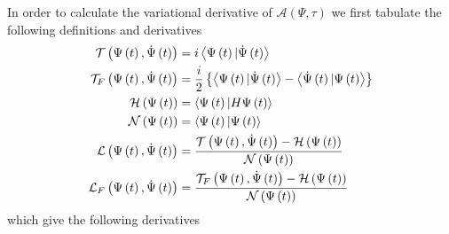 \documentclass[aps,preprint]{revtex4}
\begin{document}
In order to calculate the variational derivative of $\mathcal{A}\left(
\Psi,\tau\right) $ we first tabulate the following definitions and
derivatives 
\begin{align}
\mathcal{T}\left( \Psi\left( t\right) ,\dot{\Psi}\left( t\right) \right) &
=i\left\langle \Psi\left( t\right) |\dot{\Psi}\left( t\right) \right\rangle 
\notag \\
\mathcal{T}_{F}\left( \Psi\left( t\right) ,\dot{\Psi}\left( t\right) \right)
& =\frac{i}{2}\left\{ \left\langle \Psi\left( t\right) |\dot {\Psi}\left(
t\right) \right\rangle -\left\langle \dot{\Psi}\left( t\right) |\Psi\left(
t\right) \right\rangle \right\}  \notag \\
\mathcal{H}\left( \Psi\left( t\right) \right) & =\left\langle \Psi\left(
t\right) |H\Psi\left( t\right) \right\rangle  \notag \\
\mathcal{N}\left( \Psi\left( t\right) \right) & =\left\langle \Psi\left(
t\right) |\Psi\left( t\right) \right\rangle  \notag \\
\mathcal{L}\left( \Psi\left( t\right) ,\dot{\Psi}\left( t\right) \right) & =%
\frac{\mathcal{T}\left( \Psi\left( t\right) ,\dot{\Psi}\left( t\right)
\right) -\mathcal{H}\left( \Psi\left( t\right) \right) }{\mathcal{N}\left(
\Psi\left( t\right) \right) }  \notag \\
\mathcal{L}_{F}\left( \Psi\left( t\right) ,\dot{\Psi}\left( t\right) \right)
& =\frac{\mathcal{T}_{F}\left( \Psi\left( t\right) ,\dot{\Psi }\left(
t\right) \right) -\mathcal{H}\left( \Psi\left( t\right) \right) }{\mathcal{N}%
\left( \Psi\left( t\right) \right) }
\end{align}
which give the following derivatives 
\end{document}
